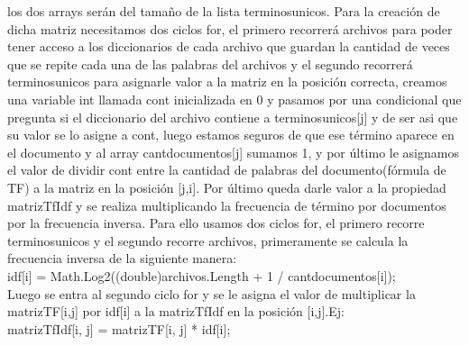 \documentclass{article}
\begin{document}
los dos arrays serán del tamaño de la lista terminosunicos. Para la creación de dicha matriz necesitamos dos ciclos for, el primero 
recorrerá archivos para poder tener acceso a los diccionarios de cada archivo que guardan la cantidad de veces que se repite 
cada una de las palabras del archivos y el segundo recorrerá terminosunicos para asignarle valor a la matriz en la posición correcta,
creamos una variable int llamada cont inicializada en 0 y pasamos por una condicional que pregunta si el diccionario del archivo 
contiene a terminosunicos[j] y de ser asi que su valor se lo asigne a cont, luego estamos seguros de que ese término aparece en el
documento y al array cantdocumentos[j] sumamos 1, y por último le asignamos el valor de dividir cont entre la cantidad de palabras del 
documento(fórmula de TF) a la matriz en la posición [j,i].
Por último queda darle valor a la propiedad matrizTfIdf y se realiza multiplicando la frecuencia de término por documentos por
la frecuencia inversa. Para ello usamos dos ciclos for, el primero recorre terminosunicos y el segundo recorre archivos, primeramente
se calcula la frecuencia inversa de la siguiente manera:\\
idf[i] = Math.Log2((double)archivos.Length + 1 / cantdocumentos[i]);\\
Luego se entra al segundo ciclo for y se le asigna el valor de multiplicar la matrizTF[i,j] por idf[i] a la matrizTfIdf en la posición
[i,j].Ej:\\
matrizTfIdf[i, j] = matrizTF[i, j] * idf[i];\\
\end{document}
